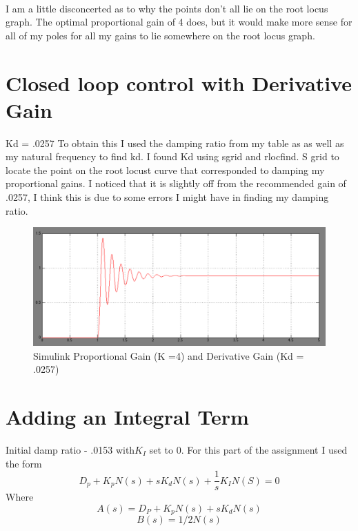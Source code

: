 \documentclass[english]{article}
\begin{document}
\paragraph{ }
I am a little disconcerted as to why the points don't all lie on the root locus graph. The optimal proportional gain of 4 does, but it would make more sense for all of my poles for all my gains to lie somewhere on the root locus graph.
\section{Closed loop control with Derivative Gain}
Kd = .0257   
To obtain this I used the damping ratio from my table as as well as my natural frequency to find kd. 
I found Kd using sgrid and rlocfind. S grid to locate the point on the root locust curve that corresponded to damping my proportional gains. I noticed that it is slightly off from the recommended gain of .0257, I think this is due to some errors I might have in finding my damping ratio. 
\begin{figure}[h!]
\includegraphics[width = \linewidth]{sim3.png}
\caption{Simulink Proportional Gain (K =4) and Derivative Gain (Kd = .0257) }
\end{figure}
\FloatBarrier


\section{Adding an Integral Term}
Initial damp ratio - .0153 with$ K_I$ set to  0.  
For this part of the assignment I used the form 
$$ D_p + K_pN(s) + sK_dN(s) + \frac{1}{s}K_IN(S) = 0 
$$ 
Where 
$$ A(s) = D_P + K_pN(s) + sK_dN(s) $$ 
$$ B(s) = 1/2N(s) $$
\end{document}
